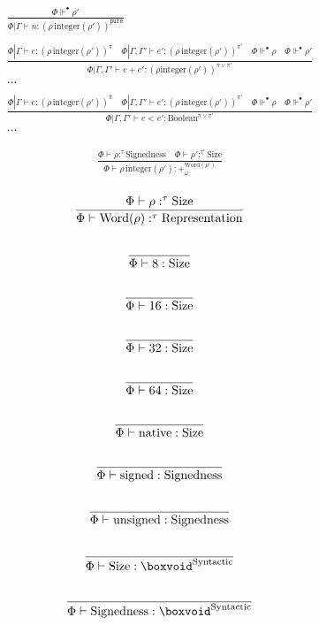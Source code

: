 \documentclass {article}
\begin{document}
\begin{gather*}
\frac
{\Phi \Vdash^\bullet \rho'}
{\Phi | \Gamma \vdash n : (\rho \, \text{integer}(\rho'))^\texttt{pure}} \\
\\
\frac
{\Phi | \Gamma \vdash e : (\rho \, \text{integer}(\rho'))^\pi \quad
\Phi | \Gamma, \Gamma' \vdash e' : (\rho \, \text{integer}(\rho'))^{\pi'} \quad
\Phi \Vdash^\bullet \rho \quad \Phi \Vdash^\bullet \rho'}
{\Phi | \Gamma, \Gamma' \vdash e + e' : (\rho \text{integer}(\rho'))^{\pi \lor \pi'}} \\
\dots \\
\\
\frac
{\Phi | \Gamma \vdash e : (\rho \, \text{integer}(\rho'))^\pi \quad
\Phi | \Gamma, \Gamma' \vdash e' : (\rho \, \text{integer}(\rho'))^{\pi'} \quad
\Phi \Vdash^\bullet \rho \quad \Phi \Vdash^\bullet \rho'}
{\Phi | \Gamma, \Gamma' \vdash e < e' : \text{Boolean}^{\pi \lor \pi'}} \\
\dots
\end{gather*}

\begin{gather*}
\frac
{\Phi \vdash \rho :^\tau \text{Signedness} \quad \Phi \vdash \rho' :^{\tau'} \text{Size}}
{\Phi \vdash \rho \, \text{integer}(\rho') : +^{\text{Word} (\rho')}_\omega } \\
\end{gather*}

\begin{gather*}
\frac
{\Phi \vdash \rho :^\tau \text{Size}}
{\Phi \vdash \text{Word} (\rho) :^\tau \text{Representation}} \\
\\
\frac
{}
{\Phi \vdash 8 : \text{Size}} \\
\\
\frac
{}
{\Phi \vdash 16 : \text{Size}} \\
\\
\frac
{}
{\Phi \vdash 32 : \text{Size}} \\
\\
\frac
{}
{\Phi \vdash 64 : \text{Size}} \\
\\
\frac
{}
{\Phi \vdash \text{native} : \text{Size}} \\
\\
\frac
{}
{\Phi \vdash \text{signed} : \text{Signedness}} \\
\\
\frac
{}
{\Phi \vdash \text{unsigned} : \text{Signedness}} \\
\\
\frac
{}
{\Phi \vdash \text{Size} : \boxvoid^\text{Syntactic}} \\
\\
\frac
{}
{\Phi \vdash \text{Signedness} : \boxvoid^\text{Syntactic}}
\end{gather*}
\end{document}
